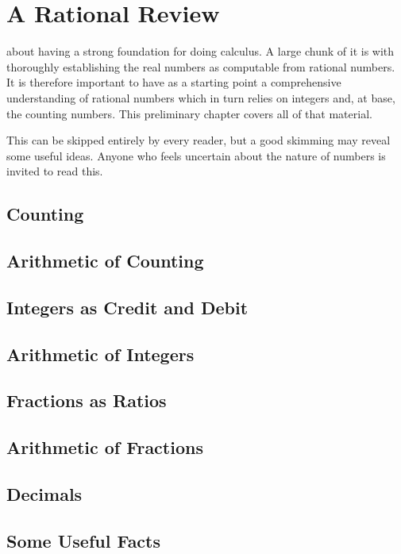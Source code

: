 \chapter{A Rational Review}

 about having a strong foundation for doing calculus. A large chunk of it is with thoroughly establishing the real numbers as computable from rational numbers. It is therefore important to have as a starting point a comprehensive understanding of rational numbers which in turn relies on integers and, at base, the counting numbers. This preliminary chapter covers all of that material. 

This can be skipped entirely by every reader, but a good skimming may reveal some useful ideas. Anyone who feels uncertain about the nature of numbers is invited to read this. 

\section{Counting}

\section{Arithmetic of Counting}

\section{Integers as Credit and Debit}

\section{Arithmetic of Integers}

\section{Fractions as Ratios}

\section{Arithmetic of Fractions}

\section{Decimals}

\section{Some Useful Facts}
